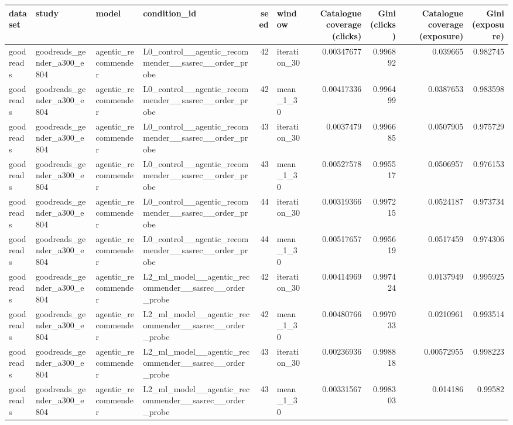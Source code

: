 \begin{table}[htbp!]
\centering
\small
\setlength{\tabcolsep}{3pt}
\renewcommand{\arraystretch}{1.1}
\begin{tabular}{llllrlrrrr}
\hline
dataset & study & model & condition\_id & seed & window & Catalogue coverage (clicks) & Gini (clicks) & Catalogue coverage (exposure) & Gini (exposure) \\
\hline
goodreads & goodreads\_gender\_a300\_e804 & agentic\_recommender & L0\_control\_\_agentic\_recommender\_\_sasrec\_\_order\_probe & 42 & iteration\_30 & 0.00347677 & 0.996892 & 0.039665 & 0.982745 \\
goodreads & goodreads\_gender\_a300\_e804 & agentic\_recommender & L0\_control\_\_agentic\_recommender\_\_sasrec\_\_order\_probe & 42 & mean\_1\_30 & 0.00417336 & 0.996499 & 0.0387653 & 0.983598 \\
goodreads & goodreads\_gender\_a300\_e804 & agentic\_recommender & L0\_control\_\_agentic\_recommender\_\_sasrec\_\_order\_probe & 43 & iteration\_30 & 0.0037479 & 0.996685 & 0.0507905 & 0.975729 \\
goodreads & goodreads\_gender\_a300\_e804 & agentic\_recommender & L0\_control\_\_agentic\_recommender\_\_sasrec\_\_order\_probe & 43 & mean\_1\_30 & 0.00527578 & 0.995517 & 0.0506957 & 0.976153 \\
goodreads & goodreads\_gender\_a300\_e804 & agentic\_recommender & L0\_control\_\_agentic\_recommender\_\_sasrec\_\_order\_probe & 44 & iteration\_30 & 0.00319366 & 0.997215 & 0.0524187 & 0.973734 \\
goodreads & goodreads\_gender\_a300\_e804 & agentic\_recommender & L0\_control\_\_agentic\_recommender\_\_sasrec\_\_order\_probe & 44 & mean\_1\_30 & 0.00517657 & 0.995619 & 0.0517459 & 0.974306 \\
goodreads & goodreads\_gender\_a300\_e804 & agentic\_recommender & L2\_ml\_model\_\_agentic\_recommender\_\_sasrec\_\_order\_probe & 42 & iteration\_30 & 0.00414969 & 0.997424 & 0.0137949 & 0.995925 \\
goodreads & goodreads\_gender\_a300\_e804 & agentic\_recommender & L2\_ml\_model\_\_agentic\_recommender\_\_sasrec\_\_order\_probe & 42 & mean\_1\_30 & 0.00480766 & 0.997033 & 0.0210961 & 0.993514 \\
goodreads & goodreads\_gender\_a300\_e804 & agentic\_recommender & L2\_ml\_model\_\_agentic\_recommender\_\_sasrec\_\_order\_probe & 43 & iteration\_30 & 0.00236936 & 0.998818 & 0.00572955 & 0.998223 \\
goodreads & goodreads\_gender\_a300\_e804 & agentic\_recommender & L2\_ml\_model\_\_agentic\_recommender\_\_sasrec\_\_order\_probe & 43 & mean\_1\_30 & 0.00331567 & 0.998303 & 0.014186 & 0.99582 \\

\end{tabular}
\end{table}
